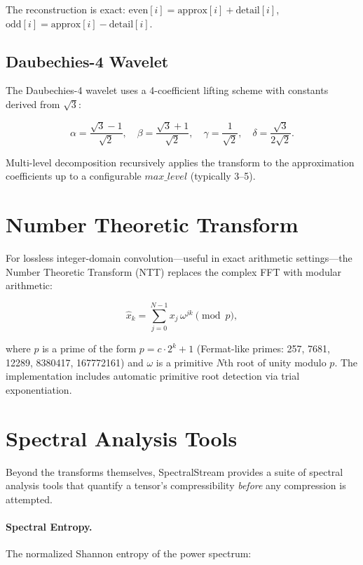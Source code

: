 \documentclass[11pt,a4paper,openright]{book}
\begin{document}
The reconstruction is exact: $\text{even}[i] = \text{approx}[i] + \text{detail}[i]$, $\text{odd}[i] = \text{approx}[i] - \text{detail}[i]$.

\subsection{Daubechies-4 Wavelet}

The Daubechies-4 wavelet uses a 4-coefficient lifting scheme with constants derived from $\sqrt{3}$:

\begin{equation}
	\label{eq:db4}
	\alpha = \frac{\sqrt{3} - 1}{\sqrt{2}},\quad
	\beta = \frac{\sqrt{3} + 1}{\sqrt{2}},\quad
	\gamma = \frac{1}{\sqrt{2}},\quad
	\delta = \frac{\sqrt{3}}{2\sqrt{2}}.
\end{equation}

Multi-level decomposition recursively applies the transform to the approximation coefficients up to a configurable $max\_level$ (typically 3--5).

\section{Number Theoretic Transform}

For lossless integer-domain convolution---useful in exact arithmetic settings---the Number Theoretic Transform (NTT) replaces the complex FFT with modular arithmetic:

\begin{equation}
	\label{eq:ntt}
	\hat{x}_k = \sum_{j=0}^{N-1} x_j \, \omega^{jk} \pmod{p},
\end{equation}

where $p$ is a prime of the form $p = c \cdot 2^k + 1$ (Fermat-like primes: 257, 7681, 12289, 8380417, 167772161) and $\omega$ is a primitive $N$th root of unity modulo $p$. The implementation includes automatic primitive root detection via trial exponentiation.

\section{Spectral Analysis Tools}

Beyond the transforms themselves, SpectralStream provides a suite of spectral analysis tools that quantify a tensor's compressibility \emph{before} any compression is attempted.

\paragraph{Spectral Entropy.}
The normalized Shannon entropy of the power spectrum:
\end{document}
